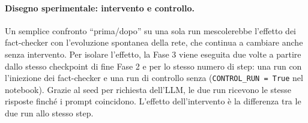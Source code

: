 \documentclass[11pt, a4paper]{article}
\begin{document}
\paragraph{Disegno sperimentale: intervento e controllo.} Un semplice confronto ``prima/dopo'' su una sola run mescolerebbe l'effetto dei fact-checker con l'evoluzione spontanea della rete, che continua a cambiare anche senza intervento. Per isolare l'effetto, la Fase 3 viene eseguita due volte a partire dallo stesso checkpoint di fine Fase 2 e per lo stesso numero di step: una run con l'iniezione dei fact-checker e una run di controllo senza (\texttt{CONTROL\_RUN = True} nel notebook). Grazie al seed per richiesta dell'LLM, le due run ricevono le stesse risposte finché i prompt coincidono. L'effetto dell'intervento è la differenza tra le due run allo stesso step.
\end{document}

